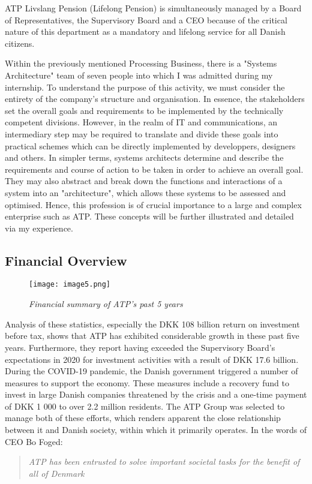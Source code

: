 ATP Livslang Pension (Lifelong Pension) is simultaneously managed by a Board of Representatives, the Supervisory Board and a CEO because of the critical nature of this department as a mandatory and lifelong service for all Danish citizens.\cite{about_atp,anno_report}

Within the previously mentioned Processing Business, there is a "Systems Architecture" team of seven people into which I was admitted during my internship. To understand the purpose of this activity, we must consider the entirety of the company's structure and organisation. In essence, the stakeholders set the overall goals and requirements to be implemented by the technically competent divisions. However, in the realm of IT and communications, an intermediary step may be required to translate and divide these goals into practical schemes which can be directly implemented by developpers, designers and others. In simpler terms, systems architects determine and describe the requirements and course of action to be taken in order to achieve an overall goal. They may also abstract and break down the functions and interactions of a system into an "architecture", which allows these systems to be assessed and optimised.\cite{sys_arch} Hence, this profession is of crucial importance to a large and complex enterprise such as ATP. These concepts will be further illustrated and detailed via my experience.

\subsection{Financial Overview}

\begin{figure}[H]
    \centering
        \texttt{[image: image5.png]}
        \caption*{\textit{Financial summary of ATP's past 5 years\cite{anno_report}}}
\end{figure}

Analysis of these statistics, especially the DKK 108 billion return on investment before tax, shows that ATP has exhibited considerable growth in these past five years. Furthermore, they report having exceeded the Supervisory Board's expectations in 2020 for investment activities with a result of DKK 17.6 billion.\cite{anno_report} During the COVID-19 pandemic, the Danish government triggered a number of measures to support the economy. These measures include a recovery fund to invest in large Danish companies threatened by the crisis and a one-time payment of DKK 1 000 to over 2.2 million residents. The ATP Group was selected to manage both of these efforts, which renders apparent the close relationship between it and Danish society, within which it primarily operates.\cite{covid_response} In the words of CEO Bo Foged:

\begin{quote}
    \color{dgreen} \textit{ATP has been entrusted to solve important societal tasks for the benefit of all of Denmark}
\end{quote}


